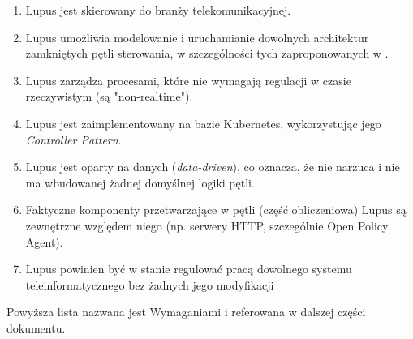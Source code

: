 \begin{enumerate}
    \item \label{req:1} Lupus jest skierowany do branży telekomunikacyjnej.
    \item \label{req:2} Lupus umożliwia modelowanie i uruchamianie dowolnych architektur zamkniętych pętli sterowania, w szczególności tych zaproponowanych w \cite{enioverview}.
    \item \label{req:3} Lupus zarządza procesami, które nie wymagają regulacji w czasie rzeczywistym (są "non-realtime").
    \item \label{req:4} Lupus jest zaimplementowany na bazie Kubernetes, wykorzystując jego \textit{Controller Pattern}.
    \item \label{req:5} Lupus jest oparty na danych (\textit{data-driven}), co oznacza, że nie narzuca i nie ma wbudowanej żadnej domyślnej logiki pętli.
    \item \label{req:6} Faktyczne komponenty przetwarzające w pętli (część obliczeniowa) Lupus są zewnętrzne względem niego (np. serwery HTTP, szczególnie Open Policy Agent).
    \item \label{reg:7} Lupus powinien być w stanie regulować pracą dowolnego systemu teleinformatycznego bez żadnych jego modyfikacji
\end{enumerate}

Powyższa lista nazwana jest Wymaganiami i referowana w dalszej części dokumentu. 
